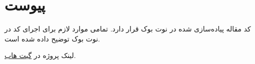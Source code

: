 \newpage
\section*{پیوست}
\RTL
کد مقاله پیاده‌سازی شده در نوت بوک 
قرار دارد. تمامی موارد لازم برای اجرای کد در نوت بوک توضیح داده شده است.

لینک پروژه در
\href{https://github.com/maryamhashemi/Persian_VQA}{گیت هاب}.